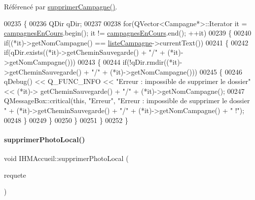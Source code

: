 Référencé par \hyperlink{ihmaccueil_8cpp_source_l00375}{supprimer\+Campagne()}.


\begin{DoxyCode}
00235 \{
00236     QDir qDir;
00237 
00238     \textcolor{keywordflow}{for}(QVector<Campagne*>::Iterator it = \hyperlink{class_i_h_m_accueil_ad3827b81480eb201b5927c16a2ad1c46}{campagnesEnCours}.begin(); it != 
      \hyperlink{class_i_h_m_accueil_ad3827b81480eb201b5927c16a2ad1c46}{campagnesEnCours}.end(); ++it)
00239     \{
00240         \textcolor{keywordflow}{if}((*it)->getNomCampagne() == \hyperlink{class_i_h_m_accueil_afb828a4e06c25afa40341c310cd85b08}{listeCampagne}->currentText())
00241         \{
00242             \textcolor{keywordflow}{if}(qDir.exists((*it)->getCheminSauvegarde() + \textcolor{stringliteral}{"/"} + (*it)->getNomCampagne()))
00243             \{
00244                 \textcolor{keywordflow}{if}(!qDir.rmdir((*it)->getCheminSauvegarde() + \textcolor{stringliteral}{"/"} + (*it)->getNomCampagne()))
00245                 \{
00246                     qDebug() << Q\_FUNC\_INFO << \textcolor{stringliteral}{"Erreur : impossible de supprimer le dossier"} << (*it)->
      getCheminSauvegarde() + \textcolor{stringliteral}{"/"} + (*it)->getNomCampagne();
00247                     QMessageBox::critical(\textcolor{keyword}{this}, \textcolor{stringliteral}{"Erreur"}, \textcolor{stringliteral}{"Erreur : impossible de supprimer le dossier "} + 
      (*it)->getCheminSauvegarde() + \textcolor{stringliteral}{"/"} + (*it)->getNomCampagne() + \textcolor{stringliteral}{" !"});
00248                 \}
00249             \}
00250         \}
00251     \}
00252 \}
\end{DoxyCode}
\mbox{\label{class_i_h_m_accueil_a9dc22241cd0d4a227b8b0bf04c6404fd}} 
\paragraph{\texorpdfstring{supprimer\+Photo\+Local()}{supprimerPhotoLocal()}}
{\footnotesize\ttfamily void I\+H\+M\+Accueil\+::supprimer\+Photo\+Local (\begin{DoxyParamCaption}\item[{Q\+String}]{requete }\end{DoxyParamCaption})\hspace{0.3cm}{\ttfamily [private]}}




